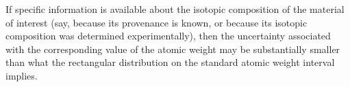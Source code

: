 \documentclass[a5paper,openany]{book}
\begin{document}
If specific information is available about the isotopic composition of the material of interest (say, because
its provenance is known, or because its isotopic composition was determined experimentally), then the
uncertainty associated with the corresponding value of the atomic weight may be substantially smaller than
what the rectangular distribution on the standard atomic weight interval implies.




\raggedright\small\printindex   

\end{document}
